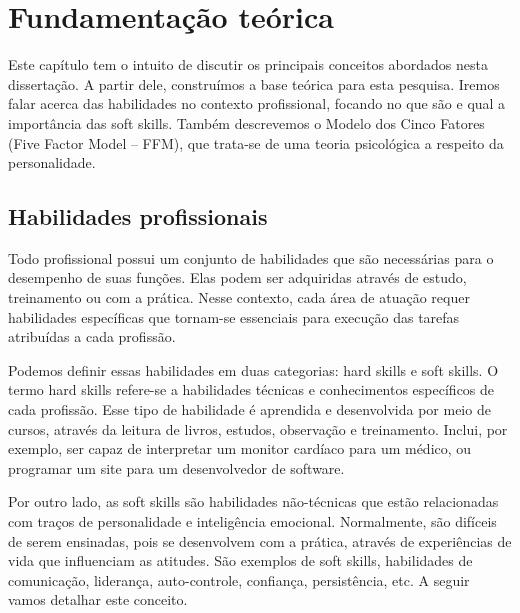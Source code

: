 

\chapter{Fundamentação teórica}

\label{chap:theorical}
\thispagestyle{empty} %

Este capítulo tem o intuito de discutir os principais conceitos abordados nesta dissertação. A partir dele, construímos a base teórica para esta pesquisa. Iremos falar acerca das habilidades no contexto profissional, focando no que são e qual a importância das soft skills. Também descrevemos o Modelo dos Cinco Fatores (Five Factor Model – FFM), que trata-se de uma teoria psicológica a respeito da personalidade.

\section{Habilidades profissionais}

Todo profissional possui um conjunto de habilidades que são necessárias para o desempenho de suas funções. Elas podem ser adquiridas através de estudo, treinamento ou com a prática. Nesse contexto, cada área de atuação requer habilidades específicas que tornam-se essenciais para execução das tarefas atribuídas a cada profissão.

Podemos definir essas habilidades em duas categorias: hard skills e soft skills. O termo hard skills refere-se a habilidades técnicas e conhecimentos específicos de cada profissão. Esse tipo de habilidade é aprendida e desenvolvida por meio de cursos, através da leitura de livros, estudos, observação e treinamento. Inclui, por exemplo, ser capaz de interpretar um monitor cardíaco para um médico, ou programar um site para um desenvolvedor de software.

Por outro lado, as soft skills são habilidades não-técnicas que estão relacionadas com traços de personalidade e inteligência emocional. Normalmente, são difíceis de serem ensinadas, pois se desenvolvem com a prática, através de experiências de vida que influenciam as atitudes. São exemplos de soft skills, habilidades de comunicação, liderança, auto-controle, confiança, persistência, etc. A seguir vamos detalhar este conceito.

